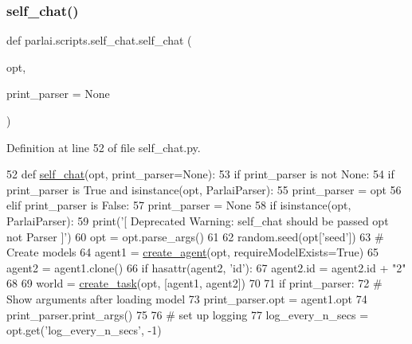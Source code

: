 \subsubsection{\texorpdfstring{self\+\_\+chat()}{self\_chat()}}
{\footnotesize\ttfamily def parlai.\+scripts.\+self\+\_\+chat.\+self\+\_\+chat (\begin{DoxyParamCaption}\item[{}]{opt,  }\item[{}]{print\+\_\+parser = {\ttfamily None} }\end{DoxyParamCaption})}



Definition at line 52 of file self\+\_\+chat.\+py.


\begin{DoxyCode}
52 \textcolor{keyword}{def }\hyperlink{namespaceparlai_1_1scripts_1_1self__chat_a3b20ced8dd92830f75efb0dc18269794}{self\_chat}(opt, print\_parser=None):
53     \textcolor{keywordflow}{if} print\_parser \textcolor{keywordflow}{is} \textcolor{keywordflow}{not} \textcolor{keywordtype}{None}:
54         \textcolor{keywordflow}{if} print\_parser \textcolor{keywordflow}{is} \textcolor{keyword}{True} \textcolor{keywordflow}{and} isinstance(opt, ParlaiParser):
55             print\_parser = opt
56         \textcolor{keywordflow}{elif} print\_parser \textcolor{keywordflow}{is} \textcolor{keyword}{False}:
57             print\_parser = \textcolor{keywordtype}{None}
58     \textcolor{keywordflow}{if} isinstance(opt, ParlaiParser):
59         print(\textcolor{stringliteral}{'[ Deprecated Warning: self\_chat should be passed opt not Parser ]'})
60         opt = opt.parse\_args()
61 
62     random.seed(opt[\textcolor{stringliteral}{'seed'}])
63     \textcolor{comment}{# Create models}
64     agent1 = \hyperlink{namespaceparlai_1_1core_1_1agents_a00d77a7e26fb89e8bd900f7b2a02982a}{create\_agent}(opt, requireModelExists=\textcolor{keyword}{True})
65     agent2 = agent1.clone()
66     \textcolor{keywordflow}{if} hasattr(agent2, \textcolor{stringliteral}{'id'}):
67         agent2.id = agent2.id + \textcolor{stringliteral}{"2"}
68 
69     world = \hyperlink{namespaceparlai_1_1core_1_1worlds_a79969c7ba76d4b3c500f5bb776444dc6}{create\_task}(opt, [agent1, agent2])
70 
71     \textcolor{keywordflow}{if} print\_parser:
72         \textcolor{comment}{# Show arguments after loading model}
73         print\_parser.opt = agent1.opt
74         print\_parser.print\_args()
75 
76     \textcolor{comment}{# set up logging}
77     log\_every\_n\_secs = opt.get(\textcolor{stringliteral}{'log\_every\_n\_secs'}, -1)

\end{DoxyCode}

